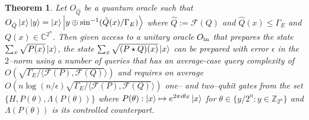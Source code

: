 \documentclass[aps,amsmath,onecolumn,amssymb]{revtex4}
\newtheorem{theorem}{Theorem}
\begin{document}
\begin{theorem}
Let  $O_{\hat{Q}}$ be a quantum oracle such that $O_{\hat{Q}}\left|x\right\rangle \left|y\right\rangle = \left|x\right\rangle \left|y\oplus \sin^{-1}(\hat{Q} (x)/\Gamma_E)\right\rangle$ where $\hat{Q}:=\mathcal{F}(Q)$ and $\hat{Q}(x)\le \Gamma_E$ and $Q(x) \in \mathbb{C}^{2^n}$.  Then given access to a unitary oracle $O_{\rm in}$ that prepares the state $\sum_x \sqrt{P(x)}\left|x\right\rangle$, the state $\sum_x \sqrt{(P\star Q) (x)}\left|x\right\rangle$ can be prepared with error $\epsilon$ in the $2$--norm using a number of queries that has an average-case query complexity of $O(\sqrt{\Gamma_E/ \langle \mathcal{F}(P), \mathcal{F}(Q)}\rangle)$ and requires on average $O(n \log(n/\epsilon)\sqrt{\Gamma_E/\langle \mathcal{F}(P), \mathcal{F}(Q)}\rangle)$ one-- and two--qubit gates from the set $\{H,P(\theta),\Lambda (P(\theta))\}$ where $P(\theta):\left|x\right\rangle\mapsto e^{2\pi i \theta x} \left|x\right\rangle$ for $\theta \in \{y/2^n:y\in \mathbb{Z}_{2^n}\}$ and $\Lambda (P(\theta))$ is its controlled counterpart.
\end{theorem}
\end{document}
